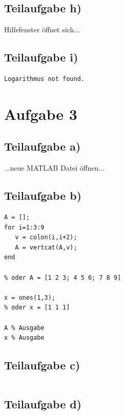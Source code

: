 \documentclass{llncs}
\begin{document}
\subsection*{Teilaufgabe h)}

Hilfefenster \"offnet sich...


\subsection*{Teilaufgabe i)}

\begin{verbatim}
Logarithmus not found.
\end{verbatim}


\section*{Aufgabe 3}

\subsection*{Teilaufgabe a)}

...neue MATLAB Datei \"offnen...

\subsection*{Teilaufgabe b)}

\begin{verbatim}
A = [];
for i=1:3:9
   v = colon(i,i+2);
   A = vertcat(A,v); 
end

% oder A = [1 2 3; 4 5 6; 7 8 9]

x = ones(1,3);
% oder x = [1 1 1]

A % Ausgabe
x % Ausgabe
\end{verbatim}


\subsection*{Teilaufgabe c)}

\begin{verbatim}

\end{verbatim}


\subsection*{Teilaufgabe d)}

\begin{verbatim}

\end{verbatim}
\end{document}
